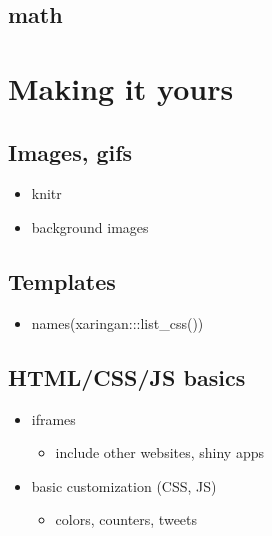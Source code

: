 \documentclass[
]{book}
\providecommand{\tightlist}{%
  \setlength{\itemsep}{0pt}\setlength{\parskip}{0pt}}
\begin{document}
\hypertarget{math}{%
\subsection{math}\label{math}}

\hypertarget{making-it-yours}{%
\section{Making it yours}\label{making-it-yours}}

\hypertarget{images-gifs}{%
\subsection{Images, gifs}\label{images-gifs}}

\begin{itemize}
\tightlist
\item
  knitr
\item
  background images
\end{itemize}

\hypertarget{templates}{%
\subsection{Templates}\label{templates}}

\begin{itemize}
\tightlist
\item
  names(xaringan:::list\_css())
\end{itemize}

\hypertarget{htmlcssjs-basics}{%
\subsection{HTML/CSS/JS basics}\label{htmlcssjs-basics}}

\begin{itemize}
\tightlist
\item
  iframes

  \begin{itemize}
  \tightlist
  \item
    include other websites, shiny apps
  \end{itemize}
\item
  basic customization (CSS, JS)

  \begin{itemize}
  \tightlist
  \item
    colors, counters, tweets
  \end{itemize}
\end{itemize}
\end{document}
